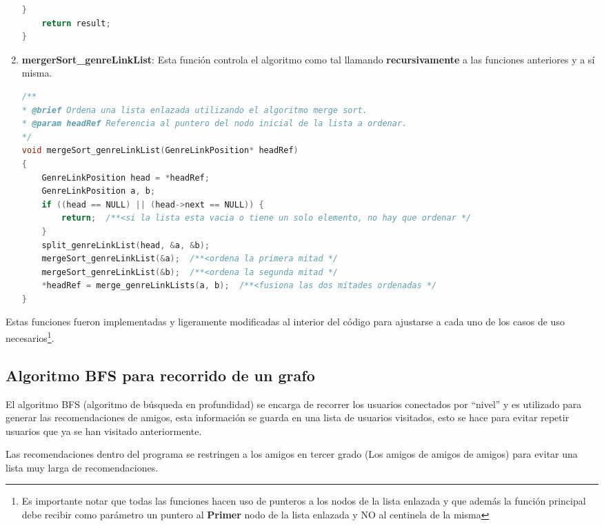 \begin{enumerate}
\begin{lstlisting}[language=C, caption={fusion de listas}, label={lst:codigo}]
    }
    return result;
}
\end{lstlisting}
    \item \textbf{mergerSort\_genreLinkList}: Esta función controla el algoritmo como tal llamando \textbf{recursivamente} a las funciones anteriores y a sí misma.
\begin{lstlisting}[language=C, caption={mergerSort\_genreLinkList}, label={lst:codigo}]
/**
* @brief Ordena una lista enlazada utilizando el algoritmo merge sort.
* @param headRef Referencia al puntero del nodo inicial de la lista a ordenar.
*/
void mergeSort_genreLinkList(GenreLinkPosition* headRef)
{
    GenreLinkPosition head = *headRef;
    GenreLinkPosition a, b;
    if ((head == NULL) || (head->next == NULL)) {
        return;  /**<si la lista esta vacia o tiene un solo elemento, no hay que ordenar */
    }
    split_genreLinkList(head, &a, &b);
    mergeSort_genreLinkList(&a);  /**<ordena la primera mitad */
    mergeSort_genreLinkList(&b);  /**<ordena la segunda mitad */
    *headRef = merge_genreLinkLists(a, b);  /**<fusiona las dos mitades ordenadas */
}
\end{lstlisting}
\end{enumerate}

Estas funciones fueron implementadas y ligeramente modificadas al interior del código para ajustarse a cada uno de los casos de uso necesarios\footnote{Es importante notar que todas las funciones hacen uso de punteros a los nodos de la lista enlazada y que además la función principal debe recibir como parámetro un puntero al \textbf{Primer} nodo de la lista enlazada y NO al centinela de la misma}.


\newpage
\subsection{Algoritmo BFS para recorrido de un grafo}

El algoritmo BFS (algoritmo de búsqueda en profundidad) se encarga de recorrer los usuarios conectados por ``nivel'' y
es utilizado para generar las recomendaciones de amigos, esta información se guarda en una lista de usuarios visitados, esto se hace para evitar repetir usuarios que ya se han visitado anteriormente.

Las recomendaciones dentro del programa se restringen a los amigos en tercer grado (Los amigos de amigos de amigos) para evitar una lista muy larga de recomendaciones.

